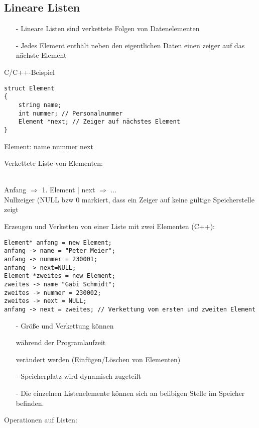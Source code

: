 \subsection{Lineare Listen} %
\begin{itemize}
\item[-] Lineare Listen sind verkettete Folgen von Datenelementen
\item[-] Jedes Element enthält neben den eigentlichen Daten einen zeiger auf das nächste Element
\end{itemize}
C/C++-Beispiel
\begin{lstlisting}
struct Element
{
    string name;
    int nummer; // Personalnummer
    Element *next; // Zeiger auf nächstes Element 
}
\end{lstlisting}
Element: name nummer next \\
\begin{underline}Verkettete Liste von Elementen: \end{underline} \\
Anfang $\Rightarrow$ 1. Element | next $\Rightarrow$ ... \\
Nullzeiger (NULL bzw 0 markiert, dass ein Zeiger auf keine gültige Speicherstelle zeigt \\%
\begin{underline}Erzeugen und Verketten von einer Liste mit zwei Elementen (C++):\end{underline}
\begin{lstlisting}
Element* anfang = new Element;
anfang -> name = "Peter Meier";
anfang -> nummer = 230001;
anfang -> next=NULL;
Element *zweites = new Element;
zweites -> name "Gabi Schmidt";
zweites -> nummer = 230002;
zweites -> next = NULL;
anfang -> next = zweites; // Verkettung vom ersten und zweiten Element
\end{lstlisting}
\begin{itemize}
\item[-] Größe und Verkettung können \begin{underline}während der Programlaufzeit\end{underline} verändert werden (Einfügen/Löschen von Elementen)
\item[-] Speicherplatz wird dynamisch zugeteilt
\item[-] Die einzelnen Listenelemente können sich an belibigen Stelle im Speicher befinden.
\end{itemize}
\begin{underline}Operationen auf Listen:\end{underline} \\
